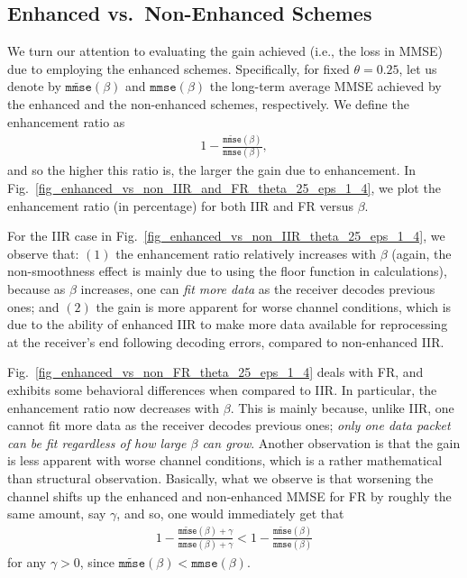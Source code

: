 \documentclass[12pt,journal,onecolumn]{IEEEtran}
\begin{document}
\subsection{Enhanced vs.~Non-Enhanced Schemes}

We turn our attention to evaluating the gain achieved (i.e., the loss in MMSE) due to employing the enhanced schemes. Specifically, for fixed $\theta=0.25$, let us denote by $\widetilde{\texttt{mmse}}(\beta)$ and $\texttt{mmse}(\beta)$ the long-term average MMSE achieved by the enhanced and the non-enhanced schemes, respectively. We define the enhancement ratio as
\begin{align}
1-\frac{\widetilde{\texttt{mmse}}(\beta)}{\texttt{mmse}(\beta)},
\end{align}
and so the higher this ratio is, the larger the gain due to enhancement. In Fig.~\ref{fig_enhanced_vs_non_IIR_and_FR_theta_25_eps_1_4}, we plot the enhancement ratio (in percentage) for both IIR and FR versus $\beta$.

For the IIR case in Fig.~\ref{fig_enhanced_vs_non_IIR_theta_25_eps_1_4}, we observe that: $(1)$ the enhancement ratio relatively increases with $\beta$ (again, the non-smoothness effect is mainly due to using the floor function in calculations), because as $\beta$ increases, one can {\it fit more data} as the receiver decodes previous ones; and $(2)$ the gain is more apparent for worse channel conditions, which is due to the ability of enhanced IIR to make more data available for reprocessing at the receiver's end following decoding errors, compared to non-enhanced IIR.

Fig.~\ref{fig_enhanced_vs_non_FR_theta_25_eps_1_4} deals with FR, and exhibits some behavioral differences when compared to IIR. In particular, the enhancement ratio now decreases with $\beta$. This is mainly because, unlike IIR, one cannot fit more data as the receiver decodes previous ones; {\it only one data packet can be fit regardless of how large $\beta$ can grow}. Another observation is that the gain is less apparent with worse channel conditions, which is a rather  mathematical than structural observation. Basically, what we observe is that worsening the channel shifts up the enhanced and non-enhanced MMSE for FR by roughly the same amount, say $\gamma$, and so, one would immediately get that
\begin{align}
1-\frac{\widetilde{\texttt{mmse}}(\beta)+\gamma}{\texttt{mmse}(\beta)+\gamma}<1-\frac{\widetilde{\texttt{mmse}}(\beta)}{\texttt{mmse}(\beta)}
\end{align}
for any $\gamma>0$, since $\widetilde{\texttt{mmse}}(\beta)<\texttt{mmse}(\beta)$.
\end{document}
